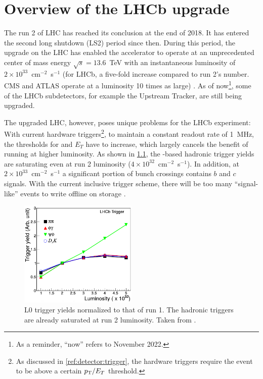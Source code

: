 \chapter{Overview of the LHCb upgrade}
\label{ref:lhcb-upgrade-overview}

The run 2 of LHC has reached its conclusion at the end of 2018.
It has entered the second long shutdown (LS2) period since then.
During this period,
the upgrade on the LHC has enabled the accelerator to operate at
an unprecedented center of mass energy $\sqrt{s} = 13.6$~TeV with an
instantaneous luminosity of $2 \times 10^{33}$~cm$^{-2}$~s$^{-1}$
(for LHCb, a five-fold increase compared to run 2's number.
CMS and ATLAS operate at a luminosity 10 times as large)
\cite{CERN_news:2022,Piucci_2017}.
As of now\footnote{
    As a reminder, ``now'' refers to November 2022.
}, some of the LHCb subdetectors, for example the Upstream Tracker, are still
being upgraded.

The upgraded LHC, however, poses unique problems for the LHCb experiment:
With current hardware triggers\footnote{
    As discussed in \cref{ref:detector:trigger},
    the hardware triggers require the event to be above a certain $p_{\mathrm{T}} / E_T$
    threshold.
},
to maintain a constant readout rate of 1~MHz,
the thresholds for \pt and $E_T$ have to increase,
which largely cancels the benefit of running at higher luminosity.
As shown in \cref{fig:l0-trigger-eff},
the \pt-based hadronic trigger yields are saturating even at run 2 luminosity
($4 \times 10^{32}$~cm$^{-2}$~s$^{-1}$).
In addition, at $2 \times 10^{33}$~cm$^{-2}$~s$^{-1}$ a significant portion of
bunch crossings contains $b$ and $c$ signals.
With the current inclusive trigger scheme,
there will be too many ``signal-like'' events to write offline on storage
\cite{Albrecht_2014}.

\begin{figure}[!htb]
    \centering
    \includegraphics[width=0.5\textwidth]{./figs-lhcb-upgrade-overview/trigger_efficiency.pdf}
    \caption{
        L0 trigger yields normalized to that of run 1.
        The hadronic triggers are already saturated at run 2 luminosity.
        Taken from \cite{Albrecht_2014}.
    }
    \label{fig:l0-trigger-eff}
\end{figure}

